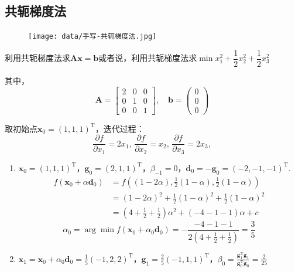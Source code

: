 \subsection{共轭梯度法}
\begin{figure}[H]
    \centering
    \texttt{[image: data/手写-共轭梯度法.jpg]}
\end{figure}
\begin{example}
    利用共轭梯度法求$\boldsymbol{Ax} = \boldsymbol{b}$或者说，利用共轭梯度法求$\min x_1^2+\dfrac{1}{2}x_2^2+\dfrac{1}{2}x_3^2$\quad{}

    其中，
    \[
        \boldsymbol{A} = \begin{bmatrix}
            2 & 0 & 0\\
            0 & 1 & 0 \\
            0 & 0 & 1
        \end{bmatrix},\quad
        \boldsymbol{b} = \begin{pmatrix}
            0\\0\\0
        \end{pmatrix}
    \]    
    \begin{solution}
        取初始点$\boldsymbol{x}_0 = (1,1,1)^{\mathrm{T}} $，迭代过程：
        \[
            \frac{\partial f}{\partial x_1} = 2x_1,\,\frac{\partial f}{\partial x_2} = x_2,\,\frac{\partial f}{\partial x_3} = 2x_3,
        \]
        \begin{enumerate}
            \item $\boldsymbol{x}_0 = (1,1,1)^{\mathrm{T}} $，$\boldsymbol{g}_0 = (2,1,1)^{\mathrm{T}}$，$\beta_{-1} = 0$，$\boldsymbol{d}_{0} = -\boldsymbol{g}_0 = (-2,-1,-1)^{\mathrm{T}}$.
            \[
                \begin{array}{ll}
                     f(\boldsymbol{x}_0+\alpha \boldsymbol{d}_0)&=f( (1-2\alpha),\frac{1}{2}(1-\alpha),\frac{1}{2}(1-\alpha) )\\
                    & = (1-2\alpha)^2+\frac{1}{2}(1-\alpha)^2+\frac{1}{2}(1-\alpha)^2\\
                    &=(4+\frac{1}{2}+\frac{1}{2})\alpha^2+(-4-1-1)\alpha+c
                \end{array}
            \]
            \[
                \alpha_0 = \arg\min f(\boldsymbol{x}_0+\alpha_0\boldsymbol{d}_0) = -\frac{-4-1-1}{2(4+\frac{1}{2}+\frac{1}{2})} = \frac{3}{5}
            \]
            \item $\boldsymbol{x}_1 = \boldsymbol{x}_0+\alpha_0\boldsymbol{d}_0=\frac{1}{5}(-1,2,2)^{\mathrm{T}} $，$\boldsymbol{g}_1 = \frac{2}{5}(-1,1,1)^{\mathrm{T}}$，$\beta_{0} = \frac{\boldsymbol{g}_1^{\mathrm{T}}\boldsymbol{g}_1}{\boldsymbol{g}_0^{\mathrm{T}}\boldsymbol{g}_0}= \frac{2}{25}$ 

\end{enumerate}
\end{solution}
\end{example}
